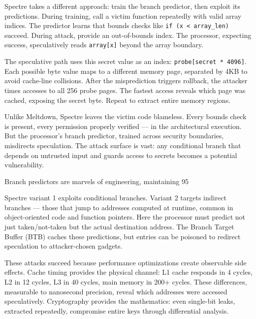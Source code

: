 Spectre takes a different approach: train the branch predictor, then exploit its predictions. During training, call a victim function repeatedly with valid array indices. The predictor learns that bounds checks like \texttt{if (x < array\_len)} succeed. During attack, provide an out-of-bounds index. The processor, expecting success, speculatively reads \texttt{array[x]} beyond the array boundary.

The speculative path uses this secret value as an index: \texttt{probe[secret * 4096]}. Each possible byte value maps to a different memory page, separated by 4KB to avoid cache-line collisions. After the misprediction triggers rollback, the attacker times accesses to all 256 probe pages. The fastest access reveals which page was cached, exposing the secret byte. Repeat to extract entire memory regions.

Unlike Meltdown, Spectre leaves the victim code blameless. Every bounds check is present, every permission properly verified — in the architectural execution. But the processor's branch predictor, trained across security boundaries, misdirects speculation. The attack surface is vast: any conditional branch that depends on untrusted input and guards access to secrets becomes a potential vulnerability.

Branch predictors are marvels of engineering, maintaining 95%

Spectre variant 1 exploits conditional branches. Variant 2 targets indirect branches — those that jump to addresses computed at runtime, common in object-oriented code and function pointers. Here the processor must predict not just taken/not-taken but the actual destination address. The Branch Target Buffer (BTB) caches these predictions, but entries can be poisoned to redirect speculation to attacker-chosen gadgets.

These attacks succeed because performance optimizations create observable side effects. Cache timing provides the physical channel: L1 cache responds in 4 cycles, L2 in 12 cycles, L3 in 40 cycles, main memory in 200+ cycles. These differences, measurable to nanosecond precision, reveal which addresses were accessed speculatively. Cryptography provides the mathematics: even single-bit leaks, extracted repeatedly, compromise entire keys through differential analysis.

